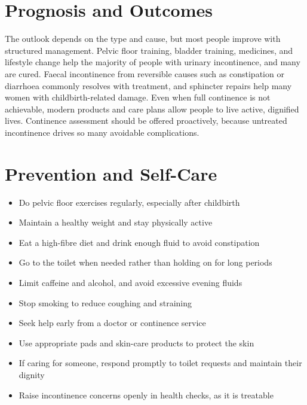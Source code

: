 \section*{Prognosis and Outcomes}
The outlook depends on the type and cause, but most people improve with structured management. Pelvic floor training, bladder training, medicines, and lifestyle change help the majority of people with urinary incontinence, and many are cured. Faecal incontinence from reversible causes such as constipation or diarrhoea commonly resolves with treatment, and sphincter repairs help many women with childbirth-related damage. Even when full continence is not achievable, modern products and care plans allow people to live active, dignified lives. Continence assessment should be offered proactively, because untreated incontinence drives so many avoidable complications.

\section*{Prevention and Self-Care}
\begin{itemize}
    \item Do pelvic floor exercises regularly, especially after childbirth
    \item Maintain a healthy weight and stay physically active
    \item Eat a high-fibre diet and drink enough fluid to avoid constipation
    \item Go to the toilet when needed rather than holding on for long periods
    \item Limit caffeine and alcohol, and avoid excessive evening fluids
    \item Stop smoking to reduce coughing and straining
    \item Seek help early from a doctor or continence service
    \item Use appropriate pads and skin-care products to protect the skin
    \item If caring for someone, respond promptly to toilet requests and maintain their dignity
    \item Raise incontinence concerns openly in health checks, as it is treatable
\end{itemize}

